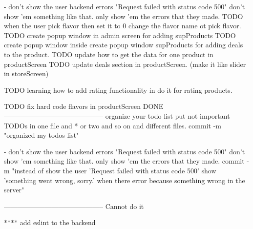 - don't show the user backend errors "Request failed with 
    status code 500" don't show 'em something like that. only 
    show 'em the errors that they made.
TODO when the user pick flavor then set it to 0 change the flavor name ot pick flavor.
TODO create popup window in admin screen for adding supProducts 
TODO create popup window inside create popup window supProducts for adding deals to the product.
TODO update how to get the data for one product in productScreen
TODO update deals section in productScreen. (make it like slider in storeScreen)

TODO learning how to add rating functionality in do it for rating products.

TODO fix hard code flavors in productScreen
DONE
--------------------------------------------
organize your todo list put not important TODOs in one file and * or two and so on and different files.
    commit -m "organized my todos list"

- don't show the user backend errors "Request failed with 
    status code 500" don't show 'em something like that. only 
    show 'em the errors that they made.
    commit -m "instead of show the user 'Request failed with 
    status code 500' show 'something went wrong, sorry.' when there error because something wrong in the server"


--------------------------------------------
Cannot do it

**** add eslint to the backend
